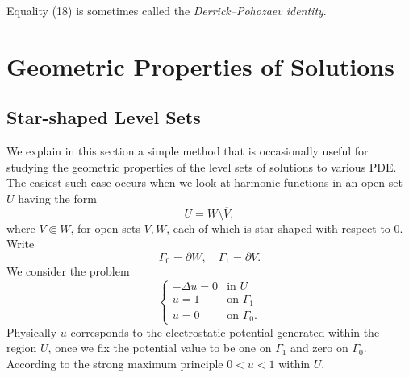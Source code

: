 \begin{remark}
\label{rem:derrick-pohozaev-identity-name}
Equality (18) is sometimes called the \textit{Derrick--Pohozaev identity}.
\end{remark}

\section{Geometric Properties of Solutions}
\label{sec:geometric-properties-of-solutions}

\subsection{Star-shaped Level Sets}
\label{sec:star-shaped-level-sets}

We explain in this section a simple method that is occasionally useful for studying the geometric properties of the level sets of solutions to various PDE. The easiest such case occurs when we look at harmonic functions in an open set $U$ having the form
\[
U = W \setminus \overline{V},
\]
where $V \Subset W$, for open sets $V, W$, each of which is star-shaped with respect to $0$. Write
\[
\Gamma_0 = \partial W, \quad \Gamma_1 = \partial V.
\]
We consider the problem
\[
\begin{cases}
-\Delta u = 0 & \text{in } U \\
u = 1 & \text{on } \Gamma_1 \\
u = 0 & \text{on } \Gamma_0.
\end{cases}
\tag{1}
\]
Physically $u$ corresponds to the electrostatic potential generated within the region $U$, once we fix the potential value to be one on $\Gamma_1$ and zero on $\Gamma_0$. According to the strong maximum principle $0 < u < 1$ within $U$.

